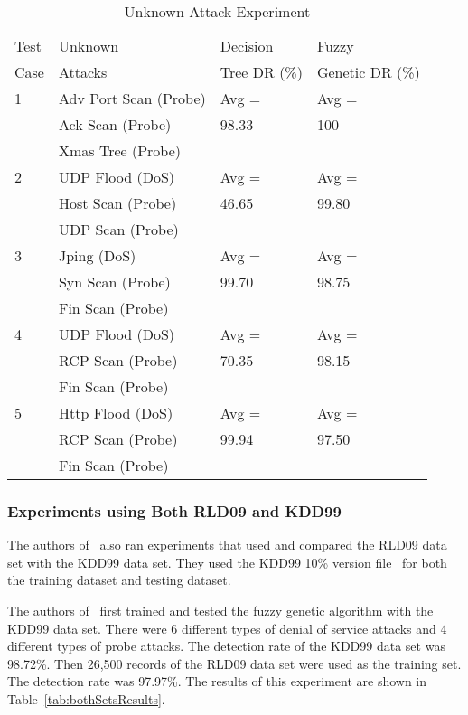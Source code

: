 \documentclass{sig-alternate}
\begin{document}
\begin{table}
\caption{Unknown Attack Experiment}
\begin{tabular}{llll}
Test & Unknown & Decision & Fuzzy\\
Case & Attacks & Tree DR (\%)  & Genetic DR (\%)\\ \hline

1 & Adv Port Scan (Probe) & Avg = & Avg =\\
  & Ack Scan (Probe)		  & 98.33 & 100\\
  & Xmas Tree (Probe)		  &		  &\\ \hline

2 & UDP Flood (DoS) & Avg = & Avg =\\
  & Host Scan (Probe) & 46.65 & 99.80\\
  & UDP Scan (Probe)  &       &\\ \hline

3 & Jping (DoS)    & Avg =          & Avg =\\
  & Syn Scan (Probe) & 99.70 & 98.75\\
  & Fin Scan (Probe) &                &\\ \hline

4 & UDP Flood (DoS) & Avg = & Avg =\\
  & RCP Scan (Probe)  & 70.35 & 98.15\\
  & Fin Scan (Probe)  &       &\\ \hline

5 & Http Flood (DoS) & Avg =          & Avg =\\
  & RCP Scan (Probe)  & 99.94 & 97.50\\
  & Fin Scan (Probe) &                &\\
\hline\end{tabular}
\label{tab:fuzGenExp2}
\end{table}




\subsubsection{Experiments using Both RLD09 and KDD99}
The authors of~\cite{6496342, 6559603} also ran experiments that used and compared the RLD09 data set with the KDD99 data set. They used the KDD99 10\% version file~\cite{KDD99} for both the training dataset and testing dataset.

The authors of~\cite{6496342, 6559603} first trained and tested the fuzzy genetic algorithm with the KDD99 data set. There were 6 different types of denial of service attacks and 4 different types of probe attacks. The detection rate of the KDD99 data set was 98.72\%. Then 26,500 records of the RLD09 data set were used as the training set. The detection rate was 97.97\%. The results of this experiment are shown in Table~\ref{tab:bothSetsResults}.
\end{document}

